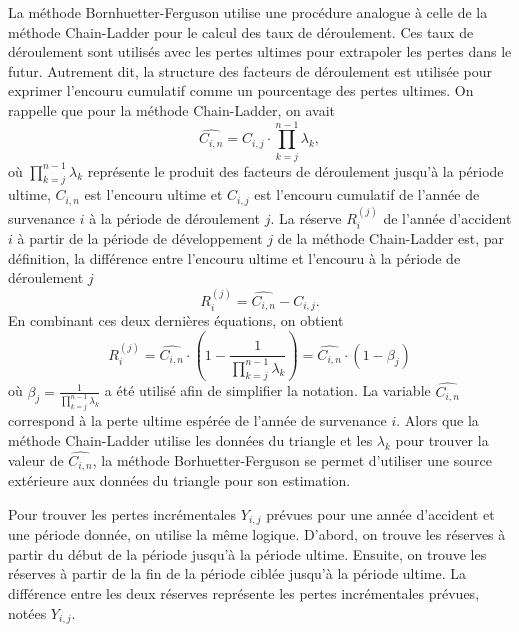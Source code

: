 La méthode Bornhuetter-Ferguson utilise une procédure analogue à celle
de la méthode Chain-Ladder pour le calcul des taux de déroulement. Ces
taux de déroulement sont utilisés avec les pertes ultimes pour
extrapoler les pertes dans le futur. Autrement dit, la structure des
facteurs de déroulement est utilisée pour exprimer l'encouru cumulatif
comme un pourcentage des pertes ultimes. On rappelle que pour la
méthode Chain-Ladder, on avait
\begin{equation*}
  \widehat{C_{i,n}} = C_{i,j} \cdot \prod_{k=j}^{n-1} \lambda_k,
\end{equation*}
où $\prod_{k=j}^{n-1} \lambda_k $ représente le produit des facteurs
de déroulement jusqu'à la période ultime, $C_{i,n}$ est l'encouru
ultime et $C_{i,j}$ est l'encouru cumulatif de l'année de survenance
$i$ à la période de déroulement $j$. La réserve $R_i^{(j)}$ de l'année
d'accident $i$ à partir de la période de développement $j$ de la
méthode Chain-Ladder est, par définition, la différence entre
l'encouru ultime et l'encouru à la période de déroulement $j$
\begin{equation*}
  R_i^{(j)} = \widehat{C_{i,n}} - C_{i,j}.
\end{equation*}
En combinant ces deux dernières équations, on obtient
\begin{equation*}
  R_i^{(j)} = \widehat{C_{i,n}} \cdot \left(1 - \frac{1}{\prod_{k=j}^{n-1} \lambda_k} \right) =  \widehat{C_{i,n}} \cdot \left(1 - \beta_j \right)
\end{equation*}
où $\beta_j = \frac{1}{\prod_{k=j}^{n-1} \lambda_k }$ a été utilisé
afin de simplifier la notation. La variable $\widehat{C_{i,n}}$
correspond à la perte ultime espérée de l'année de survenance $i$.
Alors que la méthode Chain-Ladder utilise les données du triangle et
les $\lambda_k$ pour trouver la valeur de $\widehat{C_{i,n}}$, la
méthode Borhuetter-Ferguson se permet d'utiliser une source extérieure
aux données du triangle pour son estimation.

Pour trouver les pertes incrémentales $Y_{i,j}$ prévues pour une année
d'accident et une période donnée, on utilise la même logique. D'abord,
on trouve les réserves à partir du début de la période jusqu'à la
période ultime. Ensuite, on trouve les réserves à partir de la fin de
la période ciblée jusqu'à la période ultime. La différence entre les
deux réserves représente les pertes incrémentales prévues, notées
$Y_{i,j}$.

